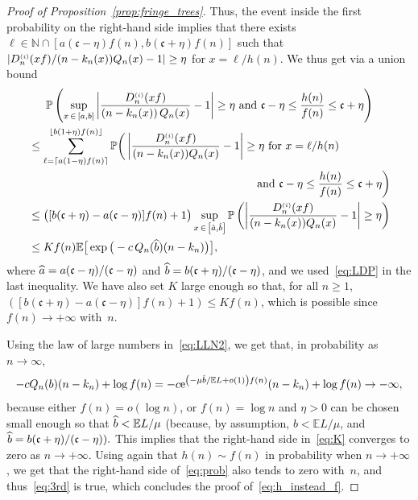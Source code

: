 \documentclass[AHL,Unicode,longabstracts,published]{cedram}
\newcommand{\sss}{\ensuremath{\scriptscriptstyle}}
\newcommand{\bbP}{\mathbb{P}}
\newcommand{\bbE}{\mathbb{E}}
\newcommand{\bbN}{\mathbb{N}}
\newcommand{\rme}{\mathrm{e}}
\newcommand{\frkc}{\mathfrak{c}}
\let\oldhat\hat
\renewcommand*{\hat}[1]{\mathchoice{\widehat{#1}}{\widehat{#1}}{\oldhat{#1}}{\oldhat{#1}}}
\begin{document}
\begin{proof}[Proof of Proposition~\ref{prop:fringe_trees}]
Thus, the event inside the first probability on the right-hand side implies that there exists $\ell\in\bbN\cap[a(\frkc-\eta)f(n), b(\frkc+\eta)f(n)]$ such that $|{D_n^{\sss (i)}(xf)}/{(n-k_n(x))Q_n(x)}-1|\geq \eta$ for $x = \ell/h(n)$. We thus get via a union bound
\begin{multline}\label{eq:K}
\bbP\left(\sup_{x\,\in\,[a,b]}\left|\frac{D_n^{\sss (i)}(xf)}{\left(n-k_n(x)\right)Q_n(x)}-1\right|\geq\eta
\text{ and } \frkc-\eta \leq \frac{h(n)}{f(n)}\leq \frkc+\eta\right)\\
\begin{aligned}
&\leq \sum_{\ell=\left\lceil a(1-\eta)f(n)\right\rceil}^{\left\lfloor b(1+\eta)f(n)\right\rfloor}
\bbP\bigg(\left|\frac{D_n^{\sss (i)}(xf)}{(n-k_n(x))Q_n(x)}-1\right|\geq\eta
\text{ for } x=\ell/h(n)\\
&\hskip20em\text{ and } \frkc-\eta \leq \frac{h(n)}{f(n)}\leq \frkc+\eta\bigg)\\
&\leq \big([b(\frkc+\eta)-a(\frkc-\eta)]f(n)+1\big)
\sup_{x\,\in\,\left[\hat a, \hat b\right]} \bbP\left(\left|\frac{D_n^{\sss (i)}(xf)}{(n-k_n(x))Q_n(x)}-1\right|\geq \eta\right)\\
&\leq Kf(n)\bbE\big[\exp\big(-c\,Q_n(\hat b)(n-k_n)\big)\big],
\end{aligned}
\end{multline}
where $\hat a = a(\frkc-\eta)/(\frkc-\eta)$ and $\hat b = b(\frkc+\eta)/(\frkc-\eta)$, and we used~\eqref{eq:LDP} in the last inequality. We have also set $K$ large enough so that, for all $n\geq 1$, $([b(\frkc+\eta)-a(\frkc-\eta)]f(n)+1)\leq Kf(n)$, which is possible since $f(n)\to+\infty$ with~$n$.


Using the law of large numbers in~\eqref{eq:LLN2}, we get that, in probability as $n\to\infty$,
\[
-cQ_n(b)(n-k_n)+\log f(n) = -c \rme^{\left(-\mu \hat b/\bbE L+o(1)\right)f(n)}(n-k_n)+\log f(n)
\to -\infty,
\]
because either $f(n)=o(\log n)$, or $f(n) = \log n$ and $\eta>0$ can be chosen small enough so that $\hat b<\bbE L/\mu$ (because, by assumption, $b<\bbE L/\mu$, and $\hat b = b(\frkc+\eta)/(\frkc-\eta)).$ This implies that the right-hand side in~\eqref{eq:K} converges to zero as $n\to+\infty$. Using again that $h(n)\sim f(n)$ in probability when $n\to+\infty$, we get that the right-hand side of~\eqref{eq:prob} also tends to zero with~$n$, and thus~\eqref{eq:3rd} is true, which concludes the proof of~\eqref{eq:h_instead_f}.


\end{proof}
\end{document}
